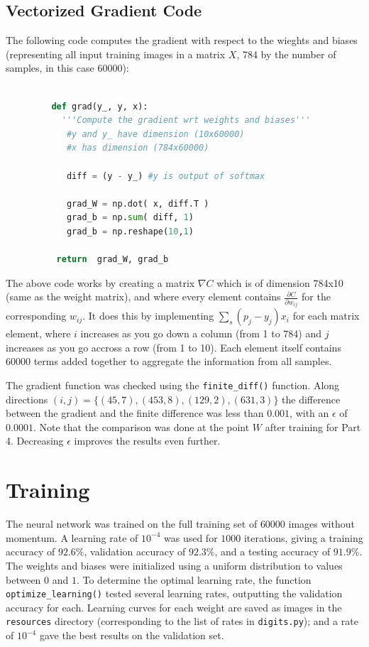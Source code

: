 \documentclass{article}
\begin{document}
   \subsection{Vectorized Gradient Code}
   The following code computes the gradient with respect to the wieghts and biases
   (representing all input training images in a matrix $X$, 784 by the number of samples, in this case 60000):
      \begin{lstlisting}[language=Python]

         def grad(y_, y, x):
      	   '''Compute the gradient wrt weights and biases'''
          	#y and y_ have dimension (10x60000)
          	#x has dimension (784x60000)

          	diff = (y - y_) #y is output of softmax

          	grad_W = np.dot( x, diff.T )
          	grad_b = np.sum( diff, 1)
          	grad_b = np.reshape(10,1)

          return  grad_W, grad_b
      \end{lstlisting}

   The above code works by creating a matrix $\nabla C $ which is of dimension 784x10
   (same as the weight matrix), and where every element contains $\frac{ \partial C}{ \partial w_{ij} }$ for the corresponding $w_{ij}$.
   It does this by implementing $\sum_s ( p_j - y_j ) x_i$ for each matrix element, where $i$ increases as you go down
   a column (from 1 to 784) and $j$ increases as you go accross a row (from 1 to 10). Each element itself contains 60000
   terms added together to aggregate the information from all samples.

   The gradient function was checked using the \texttt{finite\_diff()} function. Along directions
   $(i, j) = \{ (45,7), (453,8), (129,2), (631,3)  \}$ the difference between the gradient and the finite difference was less than $0.001$,
   with an $\epsilon$ of $0.0001$. Note that the comparison was done at the point $W$ after training for
   Part 4. Decreasing $\epsilon$ improves the results even further.

   \section{Training}
   The neural network was trained on the full training set of $60000$ images without momentum.
   A learning rate of $10^{-4}$ was used for $1000$ iterations, giving a training accuracy of $92.6\%$,
   validation accuracy of $92.3\%$, and a testing accuracy of $91.9\%$.
   The weights and biases were initialized using a uniform distribution to values between $0$ and $1$.
   To determine the optimal learning rate, the function \texttt{optimize\_learning()} tested several
   learning rates, outputting the validation accuracy for each. Learning curves for each weight
   are saved as images in the \texttt{resources} directory (corresponding to the list of
   rates in \texttt{digits.py}); and a rate of $10^{-4}$ gave the best
   results on the validation set.
\end{document}
